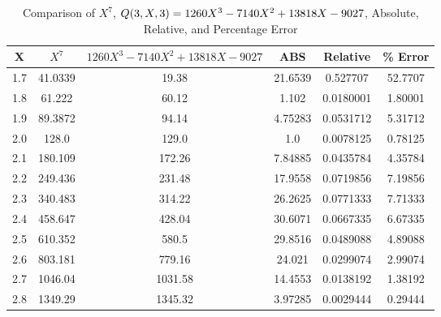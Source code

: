 ﻿\begin{table}[h!]
    \centering
    \caption{Comparison of $X^7$, ${Q}(3,X,3) = 1260X^3 - 7140X^2 + 13818X - 9027$, Absolute, Relative, and Percentage Error}
    \begin{tabular}{|c|c|c|c|c|c|}
        \hline
        \textbf{X} & \textbf{$X^7$} & \textbf{$1260X^3 - 7140X^2 + 13818X - 9027$} & \textbf{ABS} & \textbf{Relative} & \textbf{\% Error} \\ \hline
        1.7        & 41.0339        & 19.38                                        & 21.6539      & 0.527707          & 52.7707           \\ \hline
        1.8        & 61.222         & 60.12                                        & 1.102        & 0.0180001         & 1.80001           \\ \hline
        1.9        & 89.3872        & 94.14                                        & 4.75283      & 0.0531712         & 5.31712           \\ \hline
        2.0        & 128.0          & 129.0                                        & 1.0          & 0.0078125         & 0.78125           \\ \hline
        2.1        & 180.109        & 172.26                                       & 7.84885      & 0.0435784         & 4.35784           \\ \hline
        2.2        & 249.436        & 231.48                                       & 17.9558      & 0.0719856         & 7.19856           \\ \hline
        2.3        & 340.483        & 314.22                                       & 26.2625      & 0.0771333         & 7.71333           \\ \hline
        2.4        & 458.647        & 428.04                                       & 30.6071      & 0.0667335         & 6.67335           \\ \hline
        2.5        & 610.352        & 580.5                                        & 29.8516      & 0.0489088         & 4.89088           \\ \hline
        2.6        & 803.181        & 779.16                                       & 24.021       & 0.0299074         & 2.99074           \\ \hline
        2.7        & 1046.04        & 1031.58                                      & 14.4553      & 0.0138192         & 1.38192           \\ \hline
        2.8        & 1349.29        & 1345.32                                      & 3.97285      & 0.0029444         & 0.29444           \\ \hline

\end{tabular}
\end{table}
